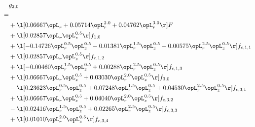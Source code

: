 \begin{alignat}{2} 
\label{eq:g_20_0} 
& g_{2,0} \nonumber \\ 
 = \\ 
& + \l[  0.06667 \opL_r +  0.05714 \opL_r^{2.0} +  0.04762 \opL_r^{3.0}  \r] F \nonumber \\ 
& + \l[  0.02857 \opL_r \opL_z^{0.5}  \r] f_{1,0} \nonumber \\ 
& + \l[  -0.14726 \opL_r^{0.5} \opL_z^{0.5}   -0.01381 \opL_r^{1.5} \opL_z^{0.5} +  0.00575 \opL_r^{2.5} \opL_z^{0.5}  \r] f_{c,1,1} \nonumber \\ 
& + \l[  0.02857 \opL_r \opL_z^{0.5}  \r] f_{c,1,2} \nonumber \\ 
& + \l[  -0.00460 \opL_r^{1.5} \opL_z^{0.5} +  0.00288 \opL_r^{2.5} \opL_z^{0.5}  \r] f_{c,1,3} \nonumber \\ 
& + \l[  0.06667 \opL_r \opL_z^{0.5} +  0.03030 \opL_r^{2.0} \opL_z^{0.5}  \r] f_{3,0} \nonumber \\ 
& - \l[  0.23623 \opL_r^{0.5} \opL_z^{0.5} +  0.07248 \opL_r^{1.5} \opL_z^{0.5} +  0.04530 \opL_r^{2.5} \opL_z^{0.5}  \r] f_{c,3,1} \nonumber \\ 
& + \l[  0.06667 \opL_r \opL_z^{0.5} +  0.04040 \opL_r^{2.0} \opL_z^{0.5}  \r] f_{c,3,2} \nonumber \\ 
& - \l[  0.02416 \opL_r^{1.5} \opL_z^{0.5} +  0.02265 \opL_r^{2.5} \opL_z^{0.5}  \r] f_{c,3,3} \nonumber \\ 
& + \l[  0.01010 \opL_r^{2.0} \opL_z^{0.5}  \r] f_{c,3,4} \nonumber \\ 
\end{alignat} 


